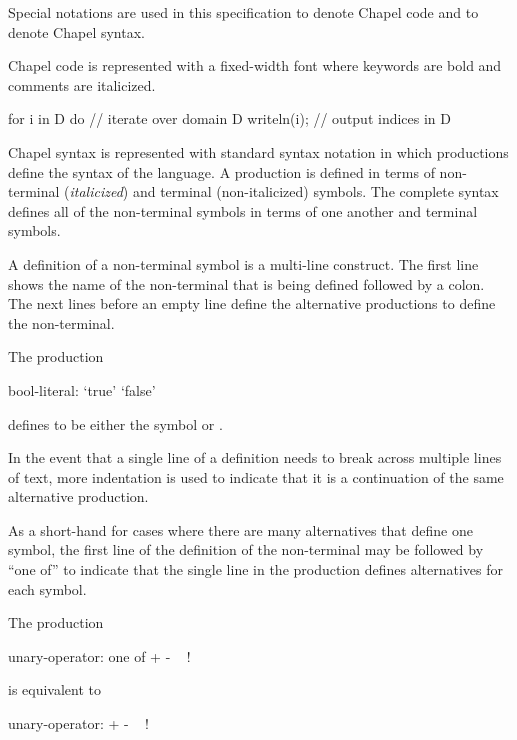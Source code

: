 \label{Notation}

Special notations are used in this specification to denote Chapel code
and to denote Chapel syntax.

Chapel code is represented with a fixed-width font where keywords are
bold and comments are italicized.
\begin{example}
\begin{chapel}
for i in D do   // iterate over domain D
  writeln(i);   // output indices in D
\end{chapel}
\end{example}

Chapel syntax is represented with standard syntax notation in which
productions define the syntax of the language.  A production is
defined in terms of non-terminal ({\it italicized}) and terminal
(non-italicized) symbols.  The complete syntax defines all of the
non-terminal symbols in terms of one another and terminal symbols.

A definition of a non-terminal symbol is a multi-line construct.  The
first line shows the name of the non-terminal that is being defined
followed by a colon.  The next lines before an empty line define the
alternative productions to define the non-terminal.
\begin{example}
The production
\begin{syntax_donotcollect}
bool-literal:
  `true'
  `false'
\end{syntax_donotcollect}
defines  to be either the symbol  or
.
\end{example}
In the event that a single line of a definition needs to break across
multiple lines of text, more indentation is used to indicate that it
is a continuation of the same alternative production.

As a short-hand for cases where there are many alternatives that
define one symbol, the first line of the definition of the
non-terminal may be followed by ``one of'' to indicate that the single
line in the production defines alternatives for each symbol.
\begin{example}
The production
\begin{syntax_donotcollect}
unary-operator: one of
  +   -   ~   !
\end{syntax_donotcollect}
is equivalent to
\begin{syntax_donotcollect}
unary-operator:
  +
  -
  ~
  !
\end{syntax_donotcollect}
\end{example}

